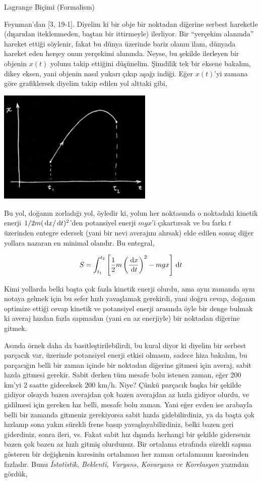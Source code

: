 \documentclass[12pt,fleqn]{article}\usepackage{../../common}
\begin{document}
Lagrange Biçimi (Formalism)

Feynman'dan [3, 19-1].  Diyelim ki bir obje bir noktadan diğerine serbest
hareketle (dışarıdan iteklenmeden, baştan bir ittirmeyle) ilerliyor. Bir
``yerçekim alanında'' hareket ettiği söylenir, fakat bu dünya üzerinde
bariz olanın ilanı, dünyada hareket eden herşey onun yerçekimi
alanında. Neyse, bu şekilde ilerleyen bir objenin $x(t)$ yolunu takip
ettiğini düşünelim. Şimdilik tek bir eksene bakalım, dikey eksen, yani
objenin nasıl yukarı çıkıp aşağı indiği. Eğer $x(t)$'yi zamana göre
grafiklersek diyelim takip edilen yol alttaki gibi,

\includegraphics[width=20em]{phy_lagrange_04.png}

Bu yol, doğanın zorladığı yol, öyledir ki, yolun her noktasında o noktadaki
kinetik enerji $1/2 m(\,\mathrm{d} x/\,\mathrm{d} t)^2$'den potansiyel enerji $mgx$'i
çıkartırsak ve bu farkı $t$ üzerinden entegre edersek (yani bir nevi
averajını alırsak) elde edilen sonuç diğer yollara nazaran en minimal
olandır. Bu entegral,

$$ 
S = \int _{t_1}^{t_2} 
\left[ 
\frac{1}{2} m \left( \frac{\,\mathrm{d} x}{\,\mathrm{d} t} \right)^2 - mgx 
\right] \,\mathrm{d} t
$$

Kimi yollarda belki başta çok fazla kinetik enerji olurdu, ama aynı zamanda
aynı notaya gelmek için bu sefer hızlı yavaşlamak gerekirdi, yani doğru
cevap, doğanın optimize ettiği cevap kinetik ve potansiyel enerji arasında
öyle bir denge bulmak ki averaj hızdan fazla sapmadan (yani en az
enerjiyle) bir noktadan diğerine gitmek. 

Asında örnek daha da basitleştirilebilirdi, bu kural diyor ki diyelim bir
serbest parçacık var, üzerinde potansiyel enerji etkisi olmasın, sadece
hiza bakalım, bu parçacığın belli bir zaman içinde bir noktadan diğerine
gitmesi için averaj, sabit hızda gitmesi gerekir. Sabit derken tüm mesafe
bolu istenen zaman, eğer 200 km'yi 2 saatte gideceksek 200 km/h. Niye?
Çünkü parçacık başka bir şekilde gidiyor olsaydı bazen averajdan çok bazen
averajdan az hızla gidiyor olurdu, ve gidilmesi için gereken hız belli,
mesafe bolu zaman. Yani eğer evden ise arabayla belli bir zamanda gitmeniz
gerekiyorsa sabit hızda gidebilirdiniz, ya da başta çok hızlanıp sona yakın
sürekli frene basıp yavaşlayabilirdiniz, belki bazen geri giderdiniz, sonra
ileri, vs. Fakat sabit hız dışında herhangi bir şekilde giderseniz bazen
çok bazen az hızlı gitmiş olurdunuz. Bir ortalama etrafında sürekli sapma
gösteren bir değişkenin karesinin ortalaması her zaman ortalamanın
karesinden fazladır. Bunu {\em İstatistik, Beklenti, Varyans, Kovaryans ve
  Korelasyon} yazından gördük,
\end{document}
